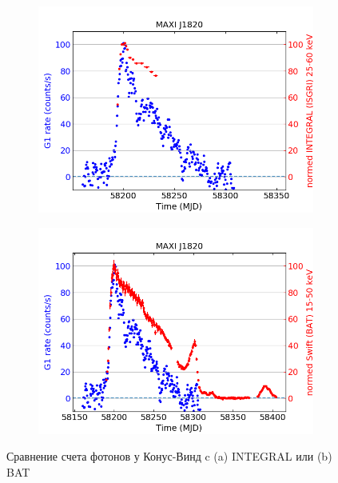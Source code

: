 	\begin{figure}[h!]
		\begin{subfigure}[b]{0.45\textwidth}
			\centering
			\includegraphics[width=\textwidth]{pictures/MAXIJ1820_kwG1_int.png}
			\caption{}
		\end{subfigure}
		\begin{subfigure}[b]{0.45\textwidth}
			\centering
			\includegraphics[width=\textwidth]{pictures/MAXIJ1820_kwG1_bat.png}
			\caption{}				
		\end{subfigure}
		\caption{Сравнение счета фотонов у Конус-Винд c (a) INTEGRAL или (b) BAT}
	\end{figure}

\newpage

	
